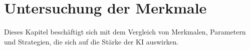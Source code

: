 
\chapter{Untersuchung der Merkmale}
\label{chap:merkmale}

Dieses Kapitel beschäftigt sich mit dem Vergleich von Merkmalen, Parametern und Strategien, die sich auf die Stärke der KI auswirken.




